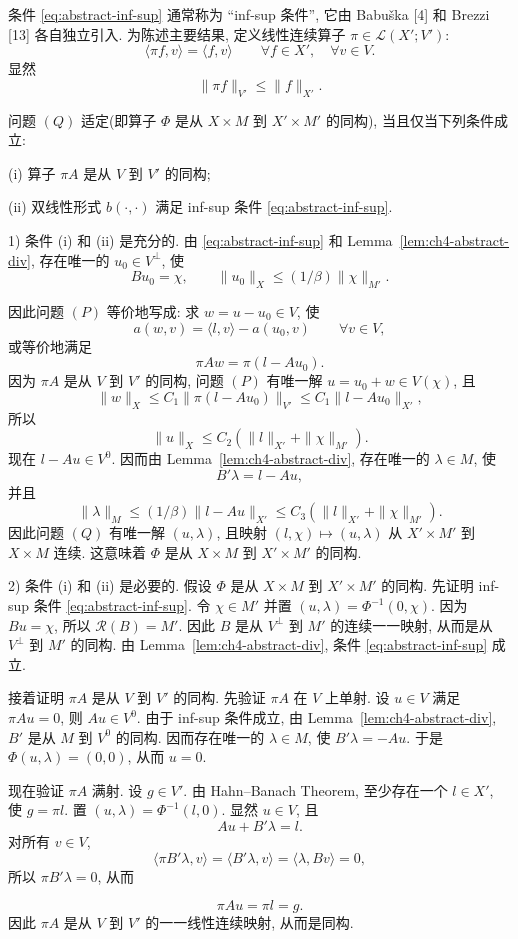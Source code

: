 条件 
\eqref{eq:abstract-inf-sup} 通常称为 ``inf-sup 条件'',
它由 Babuška [4] 和 Brezzi [13] 各自独立引入.
为陈述主要结果, 定义线性连续算子 $\pi\in\mathcal L(X';V')$:
\[
\langle\pi f,v\rangle=\langle f,v\rangle
\qquad\forall f\in X',\quad\forall v\in V.
\]
显然
\[
\|\pi f\|_{V'}\le\|f\|_{X'}.
\]

\setcounter{statement}{0}
\begin{Theorem}\label{thm:abstract-well-posedness}
问题 $(Q)$ 适定(即算子 $\Phi$ 是从 $X\times M$ 到 $X'\times M'$ 的同构),
当且仅当下列条件成立:

\textup{(i)} 算子 $\pi A$ 是从 $V$ 到 $V'$ 的同构;

\textup{(ii)} 双线性形式 $b(\cdot,\cdot)$ 满足 inf-sup 条件
\eqref{eq:abstract-inf-sup}.
\end{Theorem}
\begin{Proof}
1) 条件 (i) 和 (ii) 是充分的. 由 
\eqref{eq:abstract-inf-sup} 和 Lemma~\ref{lem:ch4-abstract-div},
存在唯一的 $u_0\in V^\perp$, 使
\[
Bu_0=\chi,
\qquad
\|u_0\|_X\le(1/\beta)\|\chi\|_{M'}.
\]

因此问题 $(P)$ 等价地写成: 求 $w=u-u_0\in V$, 使
\[
a(w,v)=\langle l,v\rangle-a(u_0,v)
\qquad\forall v\in V,
\]
或等价地满足
\[
\pi Aw=\pi(l-Au_0).
\]
因为 $\pi A$ 是从 $V$ 到 $V'$ 的同构, 问题 $(P)$ 有唯一解
$u=u_0+w\in V(\chi)$, 且
\[
\|w\|_X\le C_1\|\pi(l-Au_0)\|_{V'}
\le C_1\|l-Au_0\|_{X'},
\]
所以
\[
\|u\|_X\le C_2(\|l\|_{X'}+\|\chi\|_{M'}).
\]
现在 $l-Au\in V^0$. 因而由 Lemma~\ref{lem:ch4-abstract-div},
存在唯一的 $\lambda\in M$, 使
\[
B'\lambda=l-Au,
\]
并且
\[
\|\lambda\|_M\le(1/\beta)\|l-Au\|_{X'}
\le C_3(\|l\|_{X'}+\|\chi\|_{M'}).
\]
因此问题 $(Q)$ 有唯一解 $(u,\lambda)$, 且映射
$(l,\chi)\mapsto(u,\lambda)$ 从 $X'\times M'$ 到 $X\times M$ 连续.
这意味着 $\Phi$ 是从 $X\times M$ 到 $X'\times M'$ 的同构.

2) 条件 (i) 和 (ii) 是必要的. 假设 $\Phi$ 是从 $X\times M$ 到
$X'\times M'$ 的同构. 先证明 inf-sup 条件
\eqref{eq:abstract-inf-sup}. 令 $\chi\in M'$ 并置
$(u,\lambda)=\Phi^{-1}(0,\chi)$. 因为 $Bu=\chi$, 所以
$\mathcal R(B)=M'$. 因此 $B$ 是从 $V^\perp$ 到 $M'$ 的连续一一映射,
从而是从 $V^\perp$ 到 $M'$ 的同构. 由 Lemma~\ref{lem:ch4-abstract-div},
条件 
\eqref{eq:abstract-inf-sup} 成立.

接着证明 $\pi A$ 是从 $V$ 到 $V'$ 的同构. 先验证 $\pi A$ 在 $V$ 上单射.
设 $u\in V$ 满足 $\pi Au=0$, 则 $Au\in V^0$.
由于 inf-sup 条件成立, 由 Lemma~\ref{lem:ch4-abstract-div}, $B'$ 是从
$M$ 到 $V^0$ 的同构. 因而存在唯一的 $\lambda\in M$, 使
$B'\lambda=-Au$. 于是 $\Phi(u,\lambda)=(0,0)$, 从而 $u=0$.

现在验证 $\pi A$ 满射. 设 $g\in V'$. 由 Hahn--Banach Theorem,
至少存在一个 $l\in X'$, 使 $g=\pi l$. 置
$(u,\lambda)=\Phi^{-1}(l,0)$. 显然 $u\in V$, 且
\[
Au+B'\lambda=l.
\]
对所有 $v\in V$,
\[
\langle\pi B'\lambda,v\rangle
=\langle B'\lambda,v\rangle
=\langle\lambda,Bv\rangle=0,
\]
所以 $\pi B'\lambda=0$, 从而

\[
\pi Au=\pi l=g.
\]
因此 $\pi A$ 是从 $V$ 到 $V'$ 的一一线性连续映射, 从而是同构.
\end{Proof}

